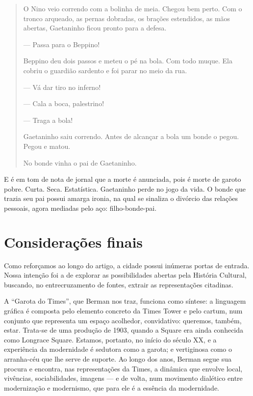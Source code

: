 \begin{refsection}
\begin{quotation}
        O Nino veio correndo com a bolinha de meia. Chegou bem perto. Com o tronco arqueado, as pernas dobradas, os brações estendidos, as mãos abertas, Gaetaninho ficou pronto para a defesa.  
    
        --- Passa para o Beppino! 
    
        Beppino deu dois passos e meteu o pé na bola. Com todo muque. Ela cobriu o guardião sardento e foi parar no meio da rua.  
    
        --- Vá dar tiro no inferno! 
    
        --- Cala a boca, palestrino! 
    
        --- Traga a bola! 
    
        Gaetaninho saiu correndo. Antes de alcançar a bola um bonde o pegou. Pegou e matou.  
    
        No bonde vinha o pai de Gaetaninho. \cite[p.~21--22]{Machado2003Contos}
    \end{quotation}


    E é em tom de nota de jornal que a morte é anunciada, pois é morte de garoto pobre. Curta. Seca. Estatística. Gaetaninho perde no jogo da vida. O bonde que trazia seu pai possui amarga ironia, na qual se sinaliza o divórcio das relações pessoais, agora mediadas pelo aço: filho-bonde-pai. \cite{Silva2010Bras}

    \section{Considerações finais}

    Como reforçamos ao longo do artigo, a cidade possui inúmeras portas de entrada. Nossa intenção foi a de explorar as possibilidades abertas pela História Cultural, buscando, no entrecruzamento de fontes, extrair as representações citadinas.  

    A ``Garota do Times'', que Berman nos traz, funciona como síntese: a linguagem gráfica é composta pelo elemento concreto da Times Tower e pelo cartum, num conjunto que representa um espaço acolhedor, convidativo: queremos, também, estar. Trata-se de uma produção de 1903, quando a Square era ainda conhecida como Longrace Square. Estamos, portanto, no início do século XX, e a experiência da modernidade é sedutora como a garota; e vertiginosa como o arranha-céu que lhe serve de suporte. Ao longo dos anos, Berman segue sua procura e encontra, nas representações da Times, a dinâmica que envolve local, vivências, sociabilidades, imagens --- e de volta, num movimento dialético entre modernização e modernismo, que para ele é a essência da modernidade.  


\end{refsection}
